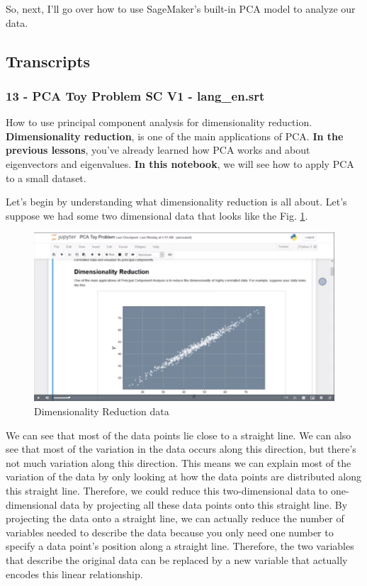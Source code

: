So, next, I'll go over how to use SageMaker's built-in PCA model to
analyze our data.

\hypertarget{transcripts}{%
\subsection{Transcripts}\label{transcripts}}

\hypertarget{pca-toy-problem-sc-v1---lang_en.srt}{%
\subsubsection{13 - PCA Toy Problem SC V1 -
lang\_en.srt}\label{pca-toy-problem-sc-v1---lang_en.srt}}

How to use principal component analysis for dimensionality reduction.
\textbf{Dimensionality reduction}, is one of the main applications of
PCA. \textbf{In the previous lessons}, you've already learned how PCA
works and about eigenvectors and eigenvalues. \textbf{In this notebook},
we will see how to apply PCA to a small dataset.

Let's begin by understanding what dimensionality reduction is all about.
Let's suppose we had some two dimensional data that looks like the Fig.
\ref{fig:dimensionality_reduction}.

\begin{figure}[htp]
  \centering
  \includegraphics[width=\linewidth]{img/dimensionality_reduction.png}
  \caption{Dimensionality Reduction data}
  \label{fig:dimensionality_reduction}
\end{figure}

We can see that most of the data points lie close to a straight line. We
can also see that most of the variation in the data occurs along this
direction, but there's not much variation along this direction. This
means we can explain most of the variation of the data by only looking
at how the data points are distributed along this straight line.
Therefore, we could reduce this two-dimensional data to one-dimensional
data by projecting all these data points onto this straight line. By
projecting the data onto a straight line, we can actually reduce the
number of variables needed to describe the data because you only need
one number to specify a data point's position along a straight line.
Therefore, the two variables that describe the original data can be
replaced by a new variable that actually encodes this linear
relationship.

